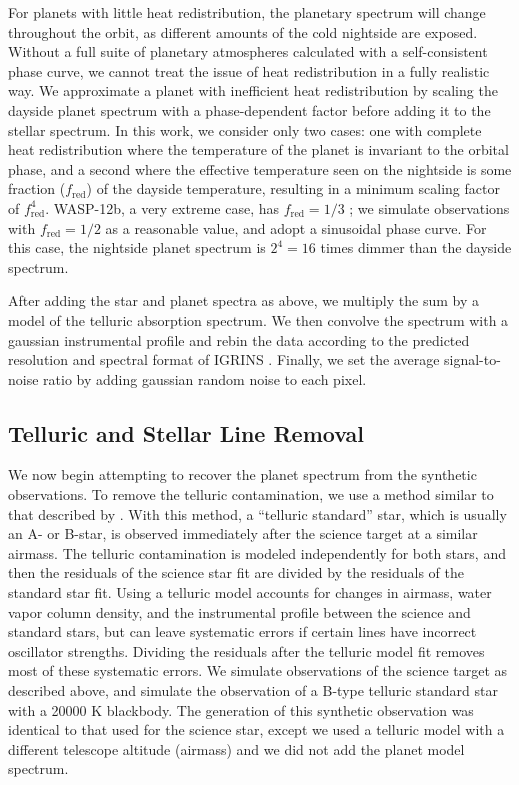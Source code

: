 For planets with little heat redistribution, the planetary spectrum will change throughout the orbit, as different amounts of the cold nightside are exposed. Without a full suite of planetary atmospheres calculated with a self-consistent phase curve, we cannot treat the issue of heat redistribution in a fully realistic way. We approximate a planet with inefficient heat redistribution by scaling the dayside planet spectrum with a phase-dependent factor before adding it to the stellar spectrum. In this work, we consider only two cases: one with complete heat redistribution where the temperature of the planet is invariant to the orbital phase, and a second where the effective temperature seen on the nightside is some fraction ($f_\mathrm{ red}$) of the dayside temperature, resulting in a minimum scaling factor of $f_\mathrm{ red}^4$. WASP-12b, a very extreme case, has $f_\mathrm{ red} = 1/3$ \citep{Cowan2012};  we simulate observations with $f_\mathrm{ red} = 1/2$ as a reasonable value, and adopt a sinusoidal phase curve. For this case, the nightside planet spectrum is $2^4 = 16$ times dimmer than the dayside spectrum.

After adding the star and planet spectra as above, we multiply the sum by a model of the telluric absorption spectrum. We then convolve the spectrum with a gaussian instrumental profile and rebin the data according to the predicted resolution and spectral format of IGRINS \citep[Figures 2 and 3 of ][]{IGRINS}. Finally, we set the average signal-to-noise ratio by adding gaussian random noise to each pixel.


\subsection{Telluric and Stellar Line Removal}
\label{paper2_sec:tellcorr}
We now begin attempting to recover the planet spectrum from the synthetic observations. To remove the
telluric contamination, we use a method similar to that described by
\cite{Rodler2012}. With this method, a ``telluric standard'' star, which is usually an A- or B-star, is observed immediately after the science target at a similar airmass. The telluric contamination is modeled independently for both stars, and then the residuals of the science star fit are divided by the residuals of the standard star fit. Using a telluric model accounts for changes in airmass, water vapor column density, and the instrumental profile between the science and standard stars, but can leave systematic errors if certain lines have incorrect oscillator strengths. Dividing the residuals after the telluric model fit removes most of these systematic errors. We simulate observations of the science target
as described above, and simulate the observation of a B-type telluric standard
star with a 20000 K blackbody. The generation of this synthetic observation
was identical to that used for the science star, except we used a
telluric model with a different telescope altitude (airmass) and we did not add the planet model spectrum. 

